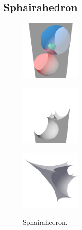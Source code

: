 \documentclass[dvipdfmx]{interact}
\theoremstyle{plain}%
\theoremstyle{definition}
\theoremstyle{remark}
\theoremstyle{problemstyle}
\begin{document}
\subsection{Sphairahedron}

\begin{figure}[h!tbp]
 \begin{minipage}[t]{0.6\textwidth}
  \centering
  \begin{minipage}[t]{0.19\textwidth}
   \includegraphics[width=1.2in, height=1.2in, keepaspectratio]
   {./img/sphairahedralPrism/sphairaAll.png}
   \label{fig:sphairaPrismAll}
  \end{minipage}
  \hspace*{\fill}
  \begin{minipage}[t]{0.19\textwidth}
   \includegraphics[width=1.2in, height=1.2in, keepaspectratio]
   {./img/sphairahedralPrism/sphairaHalf.png}
   \label{fig:sphairaPrismHalf}
  \end{minipage}
  \hspace*{\fill}
  \begin{minipage}[t]{0.19\textwidth}
   \includegraphics[width=1.2in, height=1.2in,
   keepaspectratio]{./img/sphairahedralPrism/sphairahedron.png} 
   \label{fig:sphairahedronFinite}
  \end{minipage}
  \hspace*{\fill}
  \caption{Sphairahedron.}
  \label{fig:sphairahedron}
 \end{minipage}
 \begin{minipage}[t]{0.4\textwidth}

\end{minipage}
\end{figure}
\end{document}
